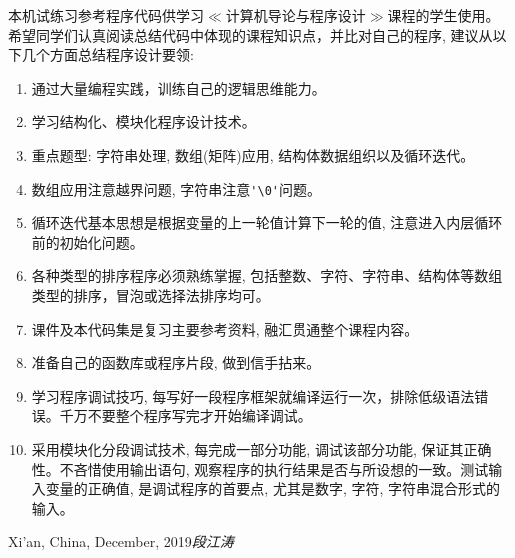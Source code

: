 %
%

\foreword



本机试练习参考程序代码供学习$\ll$计算机导论与程序设计$\gg$课程的学生使用。希望同学们认真阅读总结代码中体现的课程知识点，并比对自己的程序, 建议从以下几个方面总结程序设计要领:
\begin{enumerate}
	\item 通过大量编程实践，训练自己的逻辑思维能力。
	\item 学习结构化、模块化程序设计技术。
	\item 重点题型: 字符串处理, 数组(矩阵)应用, 结构体数据组织以及循环迭代。
	\item  数组应用注意越界问题, 字符串注意\lstinline|'\0'|问题。
	\item  循环迭代基本思想是根据变量的上一轮值计算下一轮的值, 注意进入内层循环前的初始化问题。
	\item 各种类型的排序程序必须熟练掌握, 包括整数、字符、字符串、结构体等数组类型的排序，冒泡或选择法排序均可。
	\item 课件及本代码集是复习主要参考资料, 融汇贯通整个课程内容。
	\item 准备自己的函数库或程序片段, 做到信手拈来。
	\item 学习程序调试技巧, 每写好一段程序框架就编译运行一次，排除低级语法错误。千万不要整个程序写完才开始编译调试。
	\item 采用模块化分段调试技术, 每完成一部分功能, 调试该部分功能, 保证其正确性。不吝惜使用输出语句, 观察程序的执行结果是否与所设想的一致。测试输入变量的正确值, 是调试程序的首要点, 尤其是数字, 字符, 字符串混合形式的输入。
\end{enumerate}

\vspace{\baselineskip}
\begin{flushright}\noindent
Xi'an, China, December, 2019\hfill {\it 段江涛}\\
\end{flushright}


